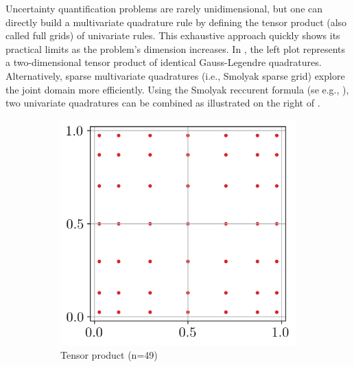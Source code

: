 Uncertainty quantification problems are rarely unidimensional, but one can directly build a multivariate quadrature rule by defining the tensor product (also called full grids) of univariate rules. 
This exhaustive approach quickly shows its practical limits as the problem's dimension increases. 
In , the left plot represents a two-dimensional tensor product of identical Gauss-Legendre quadratures. 
Alternatively, sparse multivariate quadratures (i.e., Smolyak sparse grid) explore the joint domain more efficiently. 
Using the Smolyak reccurent formula (se e.g., \citet{sullivan_2015}), two univariate quadratures can be combined as illustrated on the right of . 

\begin{figure}[h!]
    \centering
    \begin{subfigure}[b]{0.32\textwidth}
        \centering
        \includegraphics[width=\textwidth]{../numerical_experiments/chapter1/figures/tensorized_gaussian_quadrature.png}
        \caption{Tensor product (n=49)}
    \end{subfigure}
    \quad
    \begin{subfigure}[b]{0.32\textwidth}
        \centering

\end{subfigure}
\end{figure}
